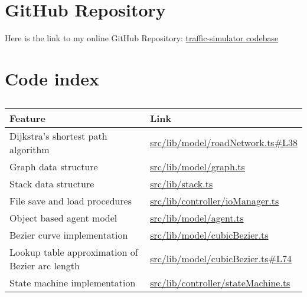 \section{GitHub Repository}

    Here is the link to my online GitHub Repository: \href{https://github.com/joshua-smart/traffic-simulator}{traffic-simulator codebase}

    \section{Code index}

    \begin{table}
        \centering
        \begin{tabular}{|p{}|p{}|}
            \hline
            \textbf{Feature} & \textbf{Link}
            \\\hline
            Dijkstra's shortest path algorithm & \href{https://github.com/joshua-smart/traffic-simulator/blob/main/src/lib/model/roadNetwork.ts#L38}{src/lib/model/roadNetwork.ts\#L38}
            \\\hline
            Graph data structure & \href{https://github.com/joshua-smart/traffic-simulator/blob/main/src/lib/model/graph.ts}{src/lib/model/graph.ts}
            \\\hline
            Stack data structure & \href{https://github.com/joshua-smart/traffic-simulator/blob/main/src/lib/stack.ts}{src/lib/stack.ts}
            \\\hline
            File save and load procedures & \href{https://github.com/joshua-smart/traffic-simulator/blob/main/src/lib/controller/ioManager.ts}{src/lib/controller/ioManager.ts}
            \\\hline
            Object based agent model & \href{https://github.com/joshua-smart/traffic-simulator/blob/main/src/lib/model/agent.ts}{src/lib/model/agent.ts}
            \\\hline
            Bezier curve implementation & \href{https://github.com/joshua-smart/traffic-simulator/blob/main/src/lib/model/cubicBezier.ts}{src/lib/model/cubicBezier.ts}
            \\\hline
            Lookup table approximation of Bezier arc length & \href{https://github.com/joshua-smart/traffic-simulator/blob/main/src/lib/model/cubicBezier.ts#L74}{src/lib/model/cubicBezier.ts\#L74}
            \\\hline
            State machine implementation & \href{https://github.com/joshua-smart/traffic-simulator/blob/main/src/lib/controller/stateMachine.ts}{src/lib/controller/stateMachine.ts}
            \\\hline
        \end{tabular}
        \caption{}
        \label{}
    \end{table}
